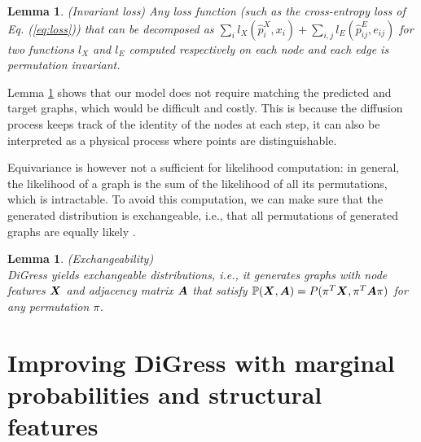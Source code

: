\documentclass{article} %
\theoremstyle{plain}
\newtheorem{lemma}[theorem]{Lemma}
\theoremstyle{definition}
\theoremstyle{remark}
\begin{document}
\begin{lemma} (Invariant loss) \label{lemma:invariant-loss} Any loss function (such as the cross-entropy loss of Eq. (\ref{eq:loss})) that can be decomposed as $\sum_{i} l_X(\hat p^X_i, x_i) + \sum_{i, j} l_E(\hat p^E_{ij}, e_{ij})$ for two functions $l_X$ and $l_E$ computed respectively on each node and each edge is permutation invariant.
\end{lemma}



Lemma \ref{lemma:invariant-loss} shows that our model does not require matching the predicted and target graphs, which would be difficult and costly. This is because the diffusion process keeps track of the identity of the nodes at each step, it can also be interpreted as a physical process where points are distinguishable. 

Equivariance is however not a sufficient for likelihood computation: in general, the likelihood of a graph is the sum of the likelihood of all its permutations, which is intractable. To avoid this computation, we can make sure that the generated distribution is exchangeable, i.e., that all permutations of generated graphs are equally likely \citep{kohler2020equivariantflows}.


\begin{lemma} (Exchangeability) \\ \label{lemma:exchangeability}
DiGress yields exchangeable distributions, i.e., it generates graphs with node features ${\bm{X}}$ and adjacency matrix ${\bm{A}}$ that satisfy $\mathbb P({\bm{X}}, {\bm{A}}) = P(\pi^T {\bm{X}}, \pi^T {\bm{A}} \pi)$ for any permutation $\pi$.
\end{lemma}



\section{Improving DiGress with marginal probabilities and structural features}
\end{document}
